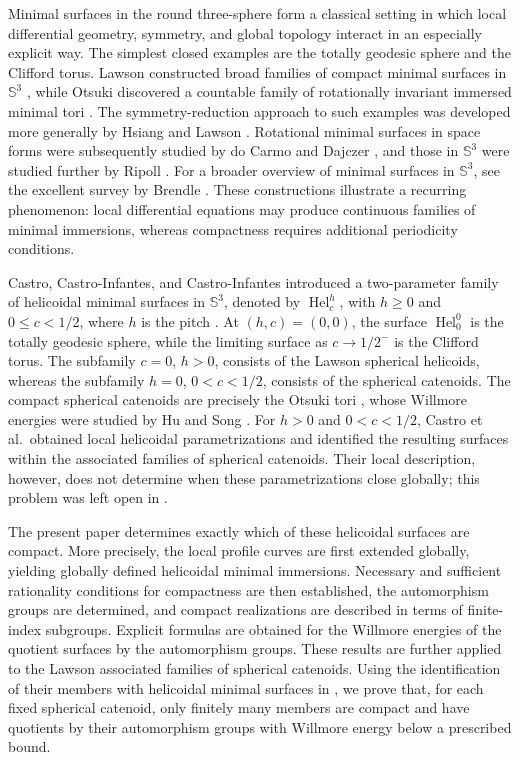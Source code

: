 \documentclass[a4paper,11pt]{amsart}
\numberwithin{equation}{section}
\theoremstyle{plain}
\begin{document}
Minimal surfaces in the round three-sphere form a classical setting in
which local differential geometry, symmetry, and global topology interact
in an especially explicit way. The simplest closed examples are the
totally geodesic sphere and the Clifford torus. Lawson constructed broad
families of compact minimal surfaces in $\mathbb S^3$
\cite{Lawson1970}, while Otsuki discovered a countable family of
rotationally invariant immersed minimal tori \cite{Otsuki1970}. The
symmetry-reduction approach to such examples was developed more generally
by Hsiang and Lawson \cite{HsiangLawson1971}. Rotational minimal surfaces
in space forms were subsequently studied by do Carmo and Dajczer
\cite{doCarmoDajczer1983}, and those in $\mathbb S^3$ were studied
further by Ripoll \cite{Ripoll1989}. For a broader overview of minimal
surfaces in $\mathbb S^3$, see the excellent survey by Brendle \cite{Brendle2013Survey}. These
constructions illustrate a recurring phenomenon: local differential
equations may produce continuous families of minimal immersions, whereas
compactness requires additional periodicity conditions.

Castro, Castro-Infantes, and Castro-Infantes introduced a two-parameter
family of helicoidal minimal surfaces in $\mathbb S^3$, denoted by
$\operatorname{Hel}_c^h$, with $h\geq0$ and $0\leq c<1/2$, where
$h$ is the pitch \cite{Castro2024}.  At
$(h,c)=(0,0)$, the surface $\operatorname{Hel}_0^0$ is the totally
geodesic sphere, while the limiting surface as $c\to1/2^-$ is the
Clifford torus. The subfamily $c=0$, $h>0$, consists of the Lawson spherical
helicoids, whereas the subfamily $h=0$, $0<c<1/2$, consists of the
spherical catenoids. The compact spherical catenoids are precisely the Otsuki tori
\cite{Otsuki1970,Castro2024}, whose Willmore energies were studied by Hu
and Song \cite{HuSong2012}. For $h>0$ and $0<c<1/2$, Castro et al.\
obtained local helicoidal parametrizations and identified the resulting
surfaces within the associated families of spherical catenoids. Their
local description, however, does not determine when these parametrizations
close globally; this problem was left open in
\cite[Remark~5.9]{Castro2024}.

The present paper determines exactly which of these helicoidal surfaces
are compact. More precisely, the local profile
curves are first extended globally, yielding globally defined helicoidal
minimal immersions. Necessary and sufficient rationality conditions for compactness are then
established, the automorphism groups are determined, and compact
realizations are described in terms of finite-index subgroups. Explicit
formulas are obtained for the Willmore energies of the quotient surfaces
by the automorphism groups. These results are further applied to the
Lawson associated families of spherical catenoids. Using the identification
of their members with helicoidal minimal surfaces in
\cite[Theorem~5.6]{Castro2024}, we prove that, for each fixed spherical
catenoid, only finitely many members are compact and have
quotients by their automorphism groups with Willmore energy below a prescribed
bound.
\end{document}
